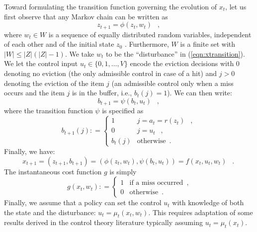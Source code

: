 \documentclass[11pt,a4paper]{article}
\DeclareMathOperator{\mf}{\enspace .}
\DeclareMathOperator{\mc}{\enspace ,}
\newcommand{\deq}{\mathrel{\mathop:}=}
\theoremstyle{definition}
\theoremstyle{remark}
\begin{document}
Toward formulating the transition function governing the evolution of
$x_t$, let us first observe that any Markov chain can be written
as
\begin{equation}\label{eqn:ztransition}
  z_{t+1} = \phi (z_t, w_t) \mc
\end{equation}
where $w_t \in W$ is a sequence of equally distributed random variables,
independent of each other and of the initial state $z_0$ \cite{LevinPW09}.
Furthermore, $W$ is a finite set with $|W| \leq |Z|(|Z|-1)$.  We take $w_t$ to
be the ``disturbance'' in (\ref{eqn:xtransition}).  We let the control input
$u_t \in \{0,1,\ldots,V\}$ encode the eviction decisions with $0$ denoting no
eviction (the only admissible control in case of a hit) and $j>0$ denoting the
eviction of the item $j$ (an admissible control only when a miss occurs and the
item $j$ is in the buffer, i.e., $b_t(j)=1$). We can then write:
\begin{equation}\label{eqn:btransition}
  b_{t+1} = \psi (b_t, u_t) \mc
\end{equation}
where the transition function $\psi$ is specified as
\begin{equation}
  b_{t+1}(j) \deq
  \begin{cases}
    1 & j = a_t = r(z_t) \mc \\
    0 & j = u_t \mc\\
    b_t(j) & \text{otherwise} \mf
  \end{cases}
\end{equation}
Finally, we have:
\begin{equation}\label{eqn:Xtransition}
  x_{t+1}= (z_{t+1}, b_{t+1}) = (\phi (z_t, w_t), \psi (b_t, u_t)) 
         = f(x_t,u_t,w_t) \mf
\end{equation}
The instantaneous cost function $g$ is simply
\begin{equation}\label{eqn:gDef}
  g(x_t, w_t) \deq
  \begin{cases}
    1 & \text{if a miss occurred} \mc\\
    0 & \text{otherwise} \mf
  \end{cases}
\end{equation}
Finally, we assume that a policy can set the control $u_t$ with
knowledge of both the state and the disturbance: $u_t=\mu_t(x_t,w_t)$.
This requires adaptation of some results derived in the control theory
literature typically assuming $u_t=\mu_t(x_t)$.
\end{document}
